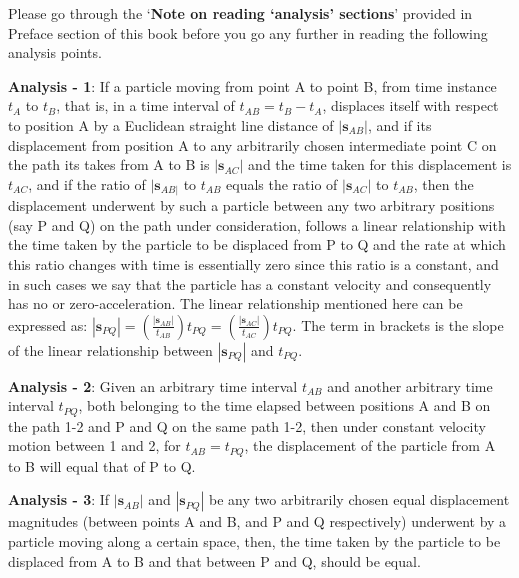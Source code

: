 Please go through the `\textbf{Note on reading `analysis' sections}' provided in Preface section of this book before you go any further in reading the following analysis points.


\begin{flushright}
\begin{minipage}[h]{10.5cm}
\small{
\textbf{Analysis - 1}: If a particle moving from point A to point B, from time instance $t_A$ to $t_B$, that is, in a time interval of $t_{AB}=t_B-t_A$, displaces itself with respect to position A by a Euclidean straight line distance of $|\mathbf{s}_{AB}|$, and if its displacement from position A to any arbitrarily chosen intermediate point C on the path its takes from A to B is $|\mathbf{s}_{AC}|$ and the time taken for this displacement is $t_{AC}$, and if the ratio of $|\mathbf{s}_{AB|}$ to $t_{AB}$ equals the ratio of $|\mathbf{s}_{AC}|$ to $t_{AB}$, then the displacement underwent by such a particle between any two arbitrary positions (say P and Q) on the path under consideration, follows a linear relationship with the time taken by the particle to be displaced from P to Q and the rate at which this ratio changes with time is essentially zero since this ratio is a constant, and in such cases we say that the particle has a constant velocity and consequently has no or zero-acceleration. The linear relationship mentioned here can be expressed as: $|\mathbf{s}_{PQ}|=\left(\frac{|\mathbf{s}_{AB}|}{t_{AB}}\right)t_{PQ}=\left(\frac{|\mathbf{s}_{AC}|}{t_{AC}}\right)t_{PQ}$. The term in brackets is the slope of the linear relationship between $|\mathbf{s}_{PQ}|$ and $t_{PQ}$.

\textbf{Analysis - 2}: Given an arbitrary time interval $t_{AB}$ and another arbitrary time interval $t_{PQ}$, both belonging to the time elapsed between positions A and B on the path 1-2 and P and Q on the same path 1-2, then under constant velocity motion between 1 and 2, for $t_{AB}=t_{PQ}$, the displacement of the particle from A to B will equal that of P to Q.

\textbf{Analysis - 3}: If $|\mathbf{s}_{AB}|$ and $|\mathbf{s}_{PQ}|$ be any two arbitrarily chosen equal displacement magnitudes (between points A and B, and P and Q respectively) underwent by a particle moving along a certain space, then, the time taken by the particle to be displaced from A to B and that between P and Q, should be equal.
}
\end{minipage}
\end{flushright}






